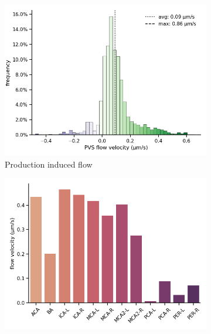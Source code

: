 \documentclass[fleqn,10pt]{wlscirep}
\begin{document}
\begin{figure}
\begin{subfigure}[b]{0.33\textwidth}
    \includegraphics[width =  \linewidth]{figures/sas_flow_velocity_histo_cell.png}
    \caption{Production induced flow}
    \end{subfigure}
    \begin{subfigure}[b]{0.33\textwidth}
    \centering
    \includegraphics[width =  \linewidth]{figures/sas_flow_arteries_labels_velocity.png}
    \end{subfigure}
    \begin{subfigure}[b]{0.33\textwidth}
    \centering

\end{subfigure}
\end{figure}
\end{document}
